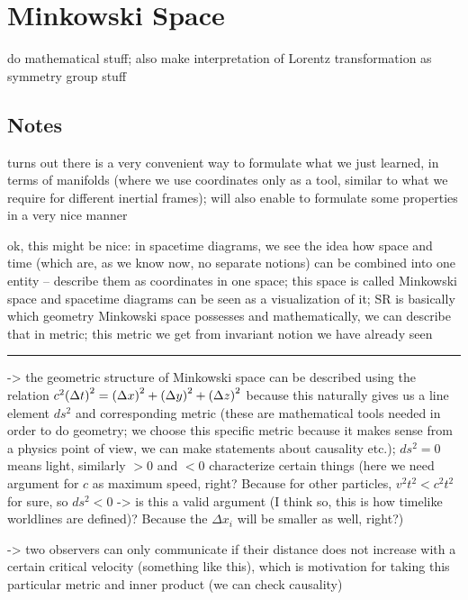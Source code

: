 \newpage



	\section{Minkowski Space}
do mathematical stuff; also make interpretation of Lorentz transformation as symmetry group stuff



		\subsection{Notes}

turns out there is a very convenient way to formulate what we just learned, in terms of manifolds (where we use coordinates only as a tool, similar to what we require for different inertial frames); will also enable to formulate some properties in a very nice manner

ok, this might be nice: in spacetime diagrams, we see the idea how space and time (which are, as we know now, no separate notions) can be combined into one entity -- describe them as coordinates in one space; this space is called Minkowski space and spacetime diagrams can be seen as a visualization of it; SR is basically which geometry Minkowski space possesses and mathematically, we can describe that in metric; this metric we get from invariant notion we have already seen

\hrule

-> the geometric structure of Minkowski space can be described using the relation $c^2 \qty(\Delta t)^2 = \qty(\Delta x)^2 + \qty(\Delta y)^2 + \qty(\Delta z)^2$ because this naturally gives us a line element $ds^2$ and corresponding metric (these are mathematical tools needed in order to do geometry; we choose this specific metric because it makes sense from a physics point of view, we can make statements about causality etc.); $ds^2 = 0$ means light, similarly $> 0$ and $< 0$ characterize certain things (here we need argument for $c$ as maximum speed, right? Because for other particles, $v^2 t^2 < c^2 t^2$ for sure, so $ds^2 < 0$ -> is this a valid argument (I think so, this is how timelike worldlines are defined)? Because the $\Delta x_i$ will be smaller as well, right?)

-> two observers can only communicate if their distance does not increase with a certain critical velocity (something like this), which is motivation for taking this particular metric and inner product (we can check causality)

